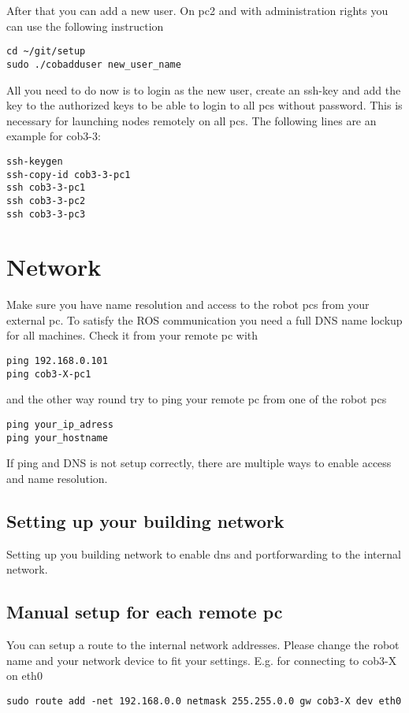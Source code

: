 After that you can add a new user. On pc2 and with administration rights you can use the following instruction
\begin{lstlisting}
cd ~/git/setup
sudo ./cobadduser new_user_name
\end{lstlisting}

All you need to do now is to login as the new user, create an ssh-key and add the key to the authorized keys to be able to login to all pcs without password. This is necessary for launching nodes remotely on all pcs. The following lines are an example for cob3-3:
\begin{lstlisting}
ssh-keygen
ssh-copy-id cob3-3-pc1
ssh cob3-3-pc1
ssh cob3-3-pc2
ssh cob3-3-pc3
\end{lstlisting}

\section{Network}
Make sure you have name resolution and access to the robot pcs from your external pc. To satisfy the ROS communication you need a full DNS name lockup for all machines. Check it from your remote pc with
\begin{lstlisting}
ping 192.168.0.101
ping cob3-X-pc1
\end{lstlisting}
and the other way round try to ping your remote pc from one of the robot pcs
\begin{lstlisting}
ping your_ip_adress
ping your_hostname
\end{lstlisting}

If ping and DNS is not setup correctly, there are multiple ways to enable access and name resolution.

\subsection{Setting up your building network}
Setting up you building network to enable dns and portforwarding to the internal network.

\subsection{Manual setup for each remote pc}
You can setup a route to the internal network addresses. Please change the robot name and your network device to fit your settings. E.g. for connecting to cob3-X on eth0
\begin{lstlisting}
sudo route add -net 192.168.0.0 netmask 255.255.0.0 gw cob3-X dev eth0
\end{lstlisting}

